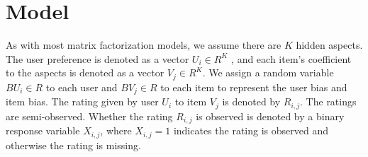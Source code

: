 \documentclass[sigconf]{acmart}
\begin{document}
\section{Model}\label{sec:model}





As with most matrix factorization models, we assume there are $K$ hidden aspects. The user preference is denoted as a vector $U_i\in R^K$ , and each item's coefficient to the aspects is denoted as a vector $V_j \in R^K$. We assign a random variable $BU_i\in R$ to each user and $BV_j\in R$ to each item to represent the user bias and item bias. The rating given by user $U_i$ to item $V_j$ is denoted by $R_{i,j}$. The ratings are semi-observed. Whether the rating $R_{i,j}$ is observed is denoted by a binary response variable $X_{i,j}$, where $X_{i,j}=1$ indicates the rating is observed and otherwise the rating is missing. 
\end{document}
